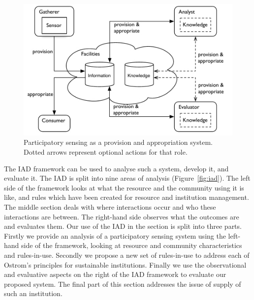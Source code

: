 \begin{figure}
\caption[Participatory sensing as a provision and appropriation system]{Participatory sensing as a provision and appropriation system. Dotted arrows represent optional actions for that role.}\label{fig:psys}
\includegraphics[width=\linewidth]{gfx/Prov_and_app_sys_diag}
\end{figure}

The \ac{IAD} framework can be used to analyse such a system, develop it, and evaluate it. 
The \ac{IAD} is split into nine areas of analysis (Figure~\ref{fig:iad}). 
The left side of the framework looks at what the resource and the community using it is like, and rules which have been created for resource and institution management. 
The middle section deals with where interactions occur and who these interactions are between. 
The right-hand side observes what the outcomes are and evaluates them.
Our use of the \ac{IAD} in the section is split into three parts.
Firstly we provide an analysis of a participatory sensing system using the left-hand side of the framework, looking at resource and community characteristics and rules-in-use. 
Secondly we propose a new set of rules-in-use to address each of Ostrom's principles for sustainable institutions. 
Finally we use the observational and evaluative aspects on the right of the \ac{IAD} framework to evaluate our proposed system.
The final part of this section addresses the issue of supply of such an institution.

